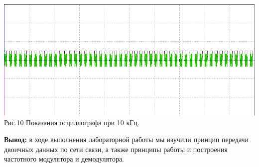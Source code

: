 \documentclass[11pt]{article}
\begin{document}
\begin{center}
    \includegraphics[width=1\linewidth]{img/third3.png}
        Рис.10 Показания осциллографа при 10 кГц.
\end{center}


\textbf{Вывод:} в ходе выполнения лабораторной работы мы изучили принцип передачи двоичных данных по сети связи, а также принципы работы и построения частотного модулятора и демодулятора.
\end{document}
